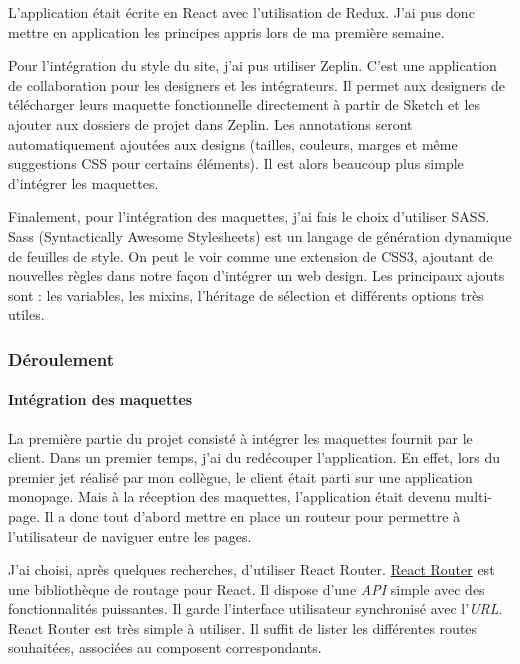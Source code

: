 \documentclass[12pt,a4paper]{article}
\begin{document}
  \bigskip

  L'application était écrite en React avec l'utilisation de Redux. J'ai
  pus donc mettre en application les principes appris lors de ma première
  semaine.

  \bigskip

  Pour l'intégration du style du site, j'ai pus utiliser Zeplin. C'est une
  application de collaboration pour les designers et les intégrateurs. Il
  permet aux designers de télécharger leurs maquette fonctionnelle
  directement à partir de Sketch et les ajouter aux dossiers de projet
  dans Zeplin. Les annotations seront automatiquement ajoutées aux designs
  (tailles, couleurs, marges et même suggestions CSS pour certains
  éléments). Il est alors beaucoup plus simple d'intégrer les maquettes.

  \bigskip

  Finalement, pour l'intégration des maquettes, j'ai fais le choix
  d'utiliser SASS. Sass (Syntactically Awesome Stylesheets) est un langage
  de génération dynamique de feuilles de style. On peut le voir comme une
  extension de CSS3, ajoutant de nouvelles règles dans notre façon
  d'intégrer un web design. Les principaux ajouts sont : les variables,
  les mixins, l'héritage de sélection et différents options très utiles.

  \bigskip

  \subsubsection{Déroulement}\label{duxe9roulement}

  \bigskip

  \paragraph{Intégration des
  maquettes}\label{intuxe9gration-des-maquettes}

  \bigskip

  La première partie du projet consisté à intégrer les maquettes fournit
  par le client. Dans un premier temps, j'ai du redécouper l'application.
  En effet, lors du premier jet réalisé par mon collègue, le client était
  parti sur une application monopage. Mais à la réception des maquettes,
  l'application était devenu multi-page. Il a donc tout d'abord mettre en
  place un routeur pour permettre à l'utilisateur de naviguer entre les
  pages.

  \bigskip

  J'ai choisi, après quelques recherches, d'utiliser React Router.
  \href{https://github.com/ReactTraining/react-router}{React Router} est
  une bibliothèque de routage pour React. Il dispose d'une \emph{API}
  simple avec des fonctionnalités puissantes. Il garde l'interface
  utilisateur synchronisé avec l'\emph{URL}. React Router est très simple
  à utiliser. Il suffit de lister les différentes routes souhaitées,
  associées au composent correspondants.
\end{document}
